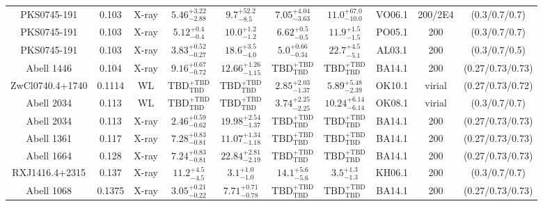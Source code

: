 \begin{table}
\begin{tabular}{cccccccccc}
PKS0745-191 & 0.103 & X-ray & ${5.46}^{+3.22}_{-2.88}$ & ${9.7}^{+52.2}_{-8.5}$ & ${7.05}^{+4.04}_{-3.63}$ & ${11.0}^{+67.0}_{-10.0}$ & VO06.1 & 200/2E4 & (0.3/0.7/0.7) \\
PKS0745-191 & 0.103 & X-ray & ${5.12}^{+0.4}_{-0.4}$ & ${10.0}^{+1.2}_{-1.2}$ & ${6.62}^{+0.5}_{-0.5}$ & ${11.9}^{+1.5}_{-1.5}$ & PO05.1 & 200 & (0.3/0.7/0.7) \\
PKS0745-191 & 0.103 & X-ray & ${3.83}^{+0.52}_{-0.27}$ & ${18.6}^{+3.5}_{-4.0}$ & ${5.0}^{+0.66}_{-0.34}$ & ${22.7}^{+4.5}_{-5.1}$ & AL03.1 & 200 & (0.3/0.7/0.5) \\
Abell 1446 & 0.104 & X-ray & ${9.16}^{+0.67}_{-0.72}$ & ${12.66}^{+1.26}_{-1.15}$ & ${\mathrm{TBD}}^{+\mathrm{TBD}}_{\mathrm{TBD}}$ & ${\mathrm{TBD}}^{+\mathrm{TBD}}_{\mathrm{TBD}}$ & BA14.1 & 200 & (0.27/0.73/0.73) \\
ZwCl0740.4+1740 & 0.1114 & WL & ${\mathrm{TBD}}^{+\mathrm{TBD}}_{\mathrm{TBD}}$ & ${\mathrm{TBD}}^{+\mathrm{TBD}}_{\mathrm{TBD}}$ & ${2.85}^{+2.03}_{-1.37}$ & ${5.89}^{+5.48}_{-2.39}$ & OK10.1 & virial & (0.27/0.73/0.72) \\
Abell 2034 & 0.113 & WL & ${\mathrm{TBD}}^{+\mathrm{TBD}}_{\mathrm{TBD}}$ & ${\mathrm{TBD}}^{+\mathrm{TBD}}_{\mathrm{TBD}}$ & ${3.74}^{+2.25}_{-2.25}$ & ${10.24}^{+6.14}_{-6.14}$ & OK08.1 & virial & (0.3/0.7/0.7) \\
Abell 2034 & 0.113 & X-ray & ${2.46}^{+0.59}_{-0.62}$ & ${19.98}^{+2.54}_{-1.37}$ & ${\mathrm{TBD}}^{+\mathrm{TBD}}_{\mathrm{TBD}}$ & ${\mathrm{TBD}}^{+\mathrm{TBD}}_{\mathrm{TBD}}$ & BA14.1 & 200 & (0.27/0.73/0.73) \\
Abell 1361 & 0.117 & X-ray & ${7.28}^{+0.83}_{-0.81}$ & ${11.07}^{+1.34}_{-1.18}$ & ${\mathrm{TBD}}^{+\mathrm{TBD}}_{\mathrm{TBD}}$ & ${\mathrm{TBD}}^{+\mathrm{TBD}}_{\mathrm{TBD}}$ & BA14.1 & 200 & (0.27/0.73/0.73) \\
Abell 1664 & 0.128 & X-ray & ${7.24}^{+0.83}_{-0.81}$ & ${22.84}^{+2.81}_{-2.19}$ & ${\mathrm{TBD}}^{+\mathrm{TBD}}_{\mathrm{TBD}}$ & ${\mathrm{TBD}}^{+\mathrm{TBD}}_{\mathrm{TBD}}$ & BA14.1 & 200 & (0.27/0.73/0.73) \\
RXJ1416.4+2315 & 0.137 & X-ray & ${11.2}^{+4.5}_{-4.5}$ & ${3.1}^{+1.0}_{-1.0}$ & ${14.1}^{+5.6}_{-5.6}$ & ${3.5}^{+1.3}_{-1.3}$ & KH06.1 & 200 & (0.3/0.7/0.7) \\
Abell 1068 & 0.1375 & X-ray & ${3.05}^{+0.21}_{-0.22}$ & ${7.71}^{+0.71}_{-0.78}$ & ${\mathrm{TBD}}^{+\mathrm{TBD}}_{\mathrm{TBD}}$ & ${\mathrm{TBD}}^{+\mathrm{TBD}}_{\mathrm{TBD}}$ & BA14.1 & 200 & (0.27/0.73/0.73) \\

\end{tabular}
\end{table}
